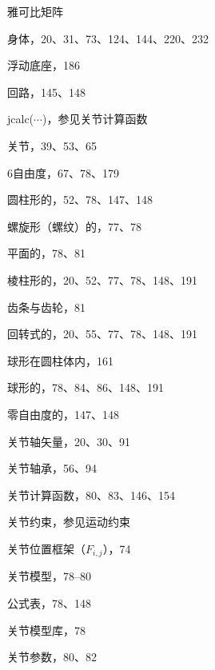 \documentclass[10pt,a4paper]{book}
\theoremstyle{thmstyle} %
\theoremstyle{defstyle} %
\theoremstyle{prostyle} %
\begin{document}
雅可比矩阵



身体，20、31、73、124、144、220、232



浮动底座，186



回路，145、148



jcalc($\cdots$)，参见关节计算函数



关节，39、53、65



6自由度，67、78、179



圆柱形的，52、78、147、148



螺旋形（螺纹）的，77、78



平面的，78、81



棱柱形的，20、52、77、78、148、191



齿条与齿轮，81



回转式的，20、55、77、78、148、191



球形在圆柱体内，161



球形的，78、84、86、148、191



零自由度的，147、148



关节轴矢量，20、30、91



关节轴承，56、94



关节计算函数，80、83、146、154



关节约束，参见运动约束



关节位置框架（$F_{i,j}$），74



关节模型，78–80



公式表，78、148



关节模型库，78



关节参数，80、82
\end{document}

